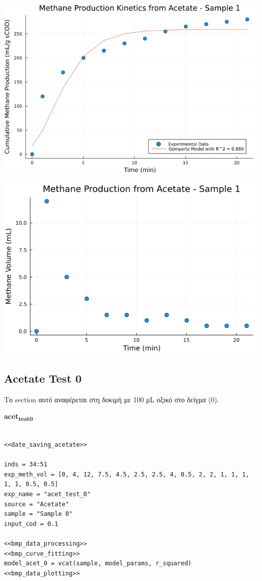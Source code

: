 \documentclass[11pt]{article}
\begin{document}
\begin{center}
\includegraphics[width=.9\linewidth]{../plots/BMPs/Acetate/methane_kinetics_acet_test_1.png}
\end{center}

\begin{center}
\includegraphics[width=.9\linewidth]{../plots/BMPs/Acetate/acet_test_1_min.png}
\end{center}

\subsection{Acetate Test 0}
\label{sec:org5dc3c49}
Το section αυτό αναφέρεται στη δοκιμή με 100 μL οξικό στο δείγμα (0).

\textbf{acet\textsubscript{test}\textsubscript{0}}
\begin{verbatim}

<<date_saving_acetate>>

inds = 34:51
exp_meth_vol = [0, 4, 12, 7.5, 4.5, 2.5, 2.5, 4, 0.5, 2, 2, 1, 1, 1, 1, 1, 0.5, 0.5]
exp_name = "acet_test_0"
source = "Acetate"
sample = "Sample 0"
input_cod = 0.1

<<bmp_data_processing>>
<<bmp_curve_fitting>>
model_acet_0 = vcat(sample, model_params, r_squared)
<<bmp_data_plotting>>
\end{verbatim}
\end{document}
